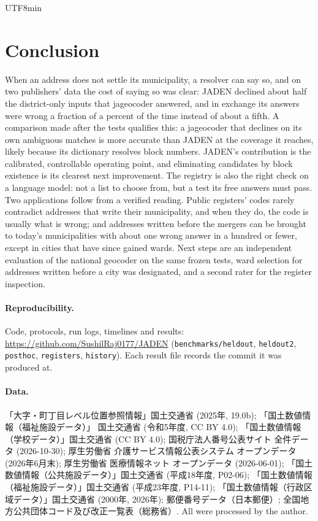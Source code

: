 \documentclass[10pt]{article}
\begin{document}
\begin{CJK}{UTF8}{min}
\section{Conclusion}
When an address does not settle its municipality, a resolver can say so, and on two publishers'
data the cost of saying so was clear: JADEN declined about half the district-only inputs that jageocoder
answered, and in exchange its answers were wrong a fraction of a percent of the time instead of about a
fifth. A comparison made after the tests qualifies this: a jageocoder that declines on its own ambiguous
matches is more accurate than JADEN at the coverage it reaches, likely because its dictionary resolves
block numbers. JADEN's contribution is the calibrated, controllable operating point, and eliminating
candidates by block existence is its clearest next improvement. The registry is also the right check on a language model: not a list to choose
from, but a test its free answers must pass. Two applications follow from a verified reading.
Public registers' codes rarely contradict addresses that write their municipality, and when they do, the
code is usually what is wrong; and addresses written before the mergers can be brought to today's
municipalities with about one wrong answer in a hundred or fewer, except in cities that have since gained
wards. Next steps are an independent evaluation of the national geocoder on the same frozen tests,
ward selection for addresses written before a city was designated, and a second rater for the register
inspection.

\paragraph{Reproducibility.}\label{sec:repro} Code, protocols, run logs, timelines and results:
\url{https://github.com/SushilRaj0177/JADEN} (\texttt{benchmarks/heldout}, \texttt{heldout2},
\texttt{posthoc}, \texttt{registers}, \texttt{history}). Each result file records the commit it was produced at.

\paragraph{Data.} 「大字・町丁目レベル位置参照情報」国土交通省 (2025年, 19.0b); 「国土数値情報（福祉施設データ）」
国土交通省 (令和5年度, CC BY 4.0); 「国土数値情報（学校データ）」国土交通省 (CC BY 4.0); 国税庁法人番号公表サイト
全件データ (2026-10-30); 厚生労働省 介護サービス情報公表システム オープンデータ (2026年6月末); 厚生労働省
医療情報ネット オープンデータ (2026-06-01); 「国土数値情報（公共施設データ）」国土交通省 (平成18年度, P02-06);
「国土数値情報（福祉施設データ）」国土交通省 (平成23年度, P14-11); 「国土数値情報（行政区域データ）」国土交通省
(2000年, 2026年); 郵便番号データ（日本郵便）; 全国地方公共団体コード及び改正一覧表（総務省）. All
were processed by the author.


\end{CJK}
\end{document}

